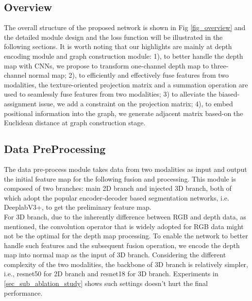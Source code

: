 ﻿\documentclass[journal]{IEEEtran}
\begin{document}
\subsection{Overview}  \label{sec_sub_overview}
 
    The overall structure of the proposed network is shown in Fig \ref{fig_overview} and the detailed module design and the loss function will be illustrated in the following sections. It is worth noting that our highlights are mainly at depth encoding module and graph construction module: 1), to better handle the depth map with CNNs, we propose to transform one-channel depth map to three-channel normal map; 2), to efficiently and effectively fuse features from two modalities, the texture-oriented projection matrix and a summation operation are used to seamlessly fuse features from two modalities; 3) to alleviate the biased-assignment issue, we add a constraint on the projection matrix; 4), to embed positional information into the graph, we generate adjacent matrix based-on the Euclidean distance at graph construction stage. \\   

\subsection{Data PreProcessing}  \label{sec_sub_depth_process}
 
    The data pre-process module takes data from two modalities as input and output the initial feature map for the following fusion and processing. This module is composed of two branches: main 2D branch and injected 3D branch, both of which adopt the popular encoder-decoder based segmentation networks, i.e. DeeplabV3+, to get the preliminary feature map. \\   

     
    For 3D branch, due to the inherently difference between RGB and depth data, as \cite{2021shapeconv} mentioned, the convolution operator that is widely adopted for RGB data might not be the optimal for the depth map processing. To enable the network to better handle such features and the subsequent fusion operation, we encode the depth map into normal map as the input of 3D branch. Considering the different complexity of the two modalities, the backbone of 3D branch is relatively simpler, i.e., resnet50 for 2D branch and resnet18 for 3D branch. Experiments in \ref{sec_sub_ablation_study} shows such settings doesn't hurt the final performance. \\   
\end{document}
